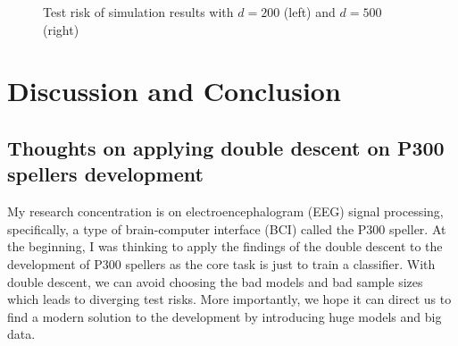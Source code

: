 \documentclass{article}
\begin{document}
\vspace{-5mm}
\begin{figure}[H]
	\centering
	\qquad
	\hspace{-8mm}
	\caption{Test risk of simulation results with $d=200$ (left) and $d=500$ (right)}
	\label{fig:2}
\end{figure}


\section{Discussion and Conclusion} \label{Conclusion}
\subsection{Thoughts on applying double descent on P300 spellers development}
My research concentration is on electroencephalogram (EEG) signal processing, specifically, a type of brain-computer interface (BCI) called the P300 speller. At the beginning, I was thinking to apply the findings of the double descent to the development of P300 spellers as the core task is just to train a classifier. With double descent, we can avoid choosing the bad models and bad sample sizes which leads to diverging test risks. More importantly, we hope it can direct us to find a modern solution to the development by introducing huge models and big data.\\
\end{document}
